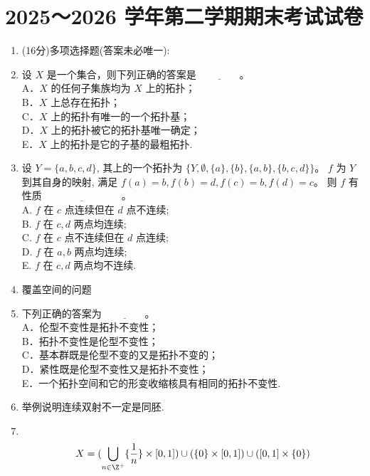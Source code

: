 
\section{2025～2026 学年第二学期期末考试试卷}
\begin{enumerate}
\item[一、](16分)多项选择题(答案未必唯一):
\item 设 $X$ 是一个集合，则下列正确的答案是 $\underline{\qquad\qquad}$。\\
A．$X$ 的任何子集族均为 $X$ 上的拓扑；\\
B．$X$ 上总存在拓扑；\\
C．$X$ 上的拓扑有唯一的一个拓扑基；\\
D．$X$ 上的拓扑被它的拓扑基唯一确定；\\
E．$X$ 上的拓扑是它的子基的最粗拓扑.
\item 设 $Y=\{a, b, c, d\}$, 其上的一个拓扑为 $\{Y, \emptyset,\{a\},\{b\},\{a, b\},\{b, c, d\}\}$。
$f$ 为 $Y$ 到其自身的映射, 满足 $f(a)=b, f(b)=d, f(c)=b, f(d)=c$。
则 $f$ 有性质$\underline{\qquad\qquad\qquad\qquad}$。\\
A. $f$ 在 $c$ 点连续但在 $d$ 点不连续;\\
B. $f$ 在 $c, d$ 两点均连续;\\
C. $f$ 在 $c$ 点不连续但在 $d$ 点连续;\\
D. $f$ 在 $a, b$ 两点均连续;\\
E. $f$ 在 $c, d$ 两点均不连续.
\item 覆盖空间的问题
\item 下列正确的答案为 $\underline{\qquad\qquad}$。\\
A．伦型不变性是拓扑不变性；\\
B．拓扑不变性是伦型不变性；\\
C．基本群既是伦型不变的又是拓扑不变的；\\
D．紧性既是伦型不变性又是拓扑不变性；\\
E．一个拓扑空间和它的形变收缩核具有相同的拓扑不变性.
\item[二、]举例说明连续双射不一定是同胚.
\item[三、]\\
$$X=(\bigcup_{n\in\Z^+}\{\frac1n\}\times[0,1])\cup(\{0\}\times[0,1])\cup([0,1]\times\{0\})$$

\end{enumerate}

